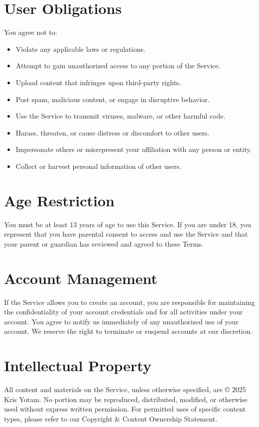 \documentclass[11pt]{article}
\begin{document}
\section{User Obligations}
You agree not to:
\begin{itemize}
  \item Violate any applicable laws or regulations.
  \item Attempt to gain unauthorized access to any portion of the Service.
  \item Upload content that infringes upon third-party rights.
  \item Post spam, malicious content, or engage in disruptive behavior.
  \item Use the Service to transmit viruses, malware, or other harmful code.
  \item Harass, threaten, or cause distress or discomfort to other users.
  \item Impersonate others or misrepresent your affiliation with any person or entity.
  \item Collect or harvest personal information of other users.
\end{itemize}

\section{Age Restriction}
You must be at least 13 years of age to use this Service. If you are under 18, you represent that you have parental consent to access and use the Service and that your parent or guardian has reviewed and agreed to these Terms.

\section{Account Management}
If the Service allows you to create an account, you are responsible for maintaining the confidentiality of your account credentials and for all activities under your account. You agree to notify us immediately of any unauthorized use of your account. We reserve the right to terminate or suspend accounts at our discretion.

\section{Intellectual Property}
All content and materials on the Service, unless otherwise specified, are © 2025 Kris Yotam. No portion may be reproduced, distributed, modified, or otherwise used without express written permission. For permitted uses of specific content types, please refer to our Copyright \& Content Ownership Statement.
\end{document}
